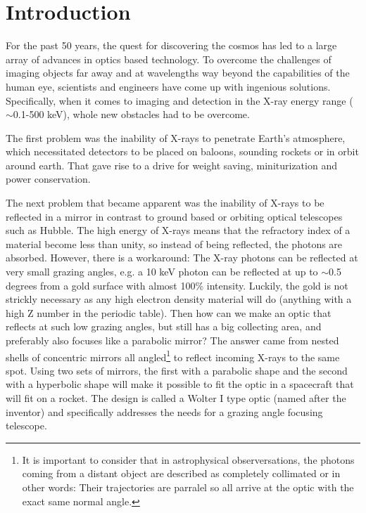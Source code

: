 \chapter{Introduction}
For the past 50 years, the quest for discovering the cosmos has led to a large array of advances in optics based technology. To overcome the challenges of imaging objects far away and at wavelengths way beyond the capabilities of the human eye, scientists and engineers have come up with ingenious solutions. Specifically, when it comes to imaging and detection in the X-ray energy range ($\sim$0.1-500 keV), whole new obstacles had to be overcome.

The first problem was the inability of X-rays to penetrate Earth's atmosphere, which necessitated detectors to be placed on baloons, sounding rockets or in orbit around earth. That gave rise to a drive for weight saving, miniturization and power conservation.

The next problem that became apparent was the inability of X-rays to be reflected in a mirror in contrast to ground based or orbiting optical telescopes such as Hubble. The high energy of X-rays means that the refractory index of a material become less than unity, so instead of being reflected, the photons are absorbed. However, there is a workaround: The X-ray photons can be reflected at very small grazing angles, e.g. a 10 keV photon can be reflected at up to $\sim$0.5 degrees from a gold surface with almost 100\% intensity. Luckily, the gold is not strickly necessary as any high electron density material will do (anything with a high Z number in the periodic table). Then how can we make an optic that reflects at such low grazing angles, but still has a big collecting area, and preferably also focuses like a parabolic mirror? The answer came from nested shells of concentric mirrors all angled\footnote{It is important to consider that in astrophysical observersations, the photons coming from a distant object are described as completely collimated or in other words: Their trajectories are parralel so all arrive at the optic with the exact same normal angle.} to reflect incoming X-rays to the same spot. Using two sets of mirrors, the first with a parabolic shape and the second with a hyperbolic shape will make it possible to fit the optic in a spacecraft that will fit on a rocket. The design is called a Wolter I type optic\cite{Wolter:1952gt,Wolter:1952ih} (named after the inventor) and specifically addresses the needs for a grazing angle focusing telescope.

